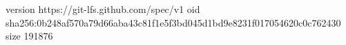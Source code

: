 version https://git-lfs.github.com/spec/v1
oid sha256:0b248af570a79d66aba43c81f1e5f3bd045d1bd9e8231f017054620c0c762430
size 191876
